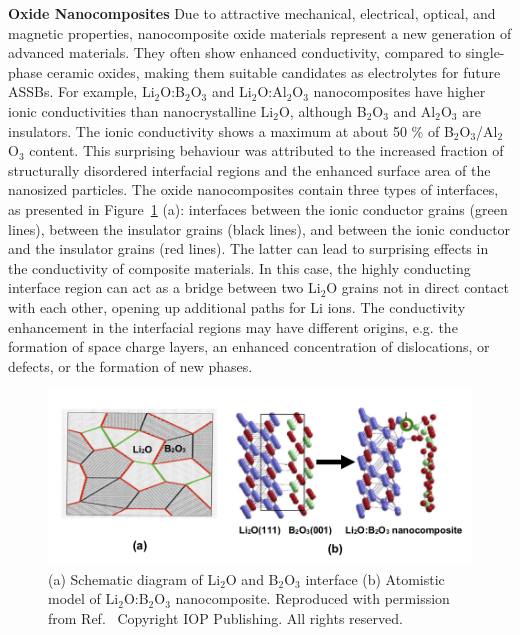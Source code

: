 \documentclass[../main.tex]{subfiles}
\begin{document}
\textbf{Oxide Nanocomposites} Due to attractive mechanical, electrical, optical, and magnetic properties, nanocomposite oxide materials represent a new generation of advanced materials.\cite{uvarov2011,Heitjans_2003} They often show enhanced conductivity, compared to single-phase ceramic oxides, making them suitable candidates as electrolytes for future ASSBs. For example, Li$_2$O:B$_2$O$_3$\cite{Heitjans_2003,Indris2000,Indris2002} and Li$_2$O:Al$_2$O$_3$ nanocomposites\cite{B300908D} have higher ionic conductivities than nanocrystalline Li$_2$O, although B$_2$O$_3$ and Al$_2$O$_3$ are insulators. The ionic conductivity shows a maximum at about 50 \% of B$_2$O$_3$/Al$_2$O$_3$ content. This surprising behaviour was attributed to the increased fraction of structurally disordered interfacial regions and the enhanced surface area of the nanosized particles.\cite{Heitjans_2003} The oxide nanocomposites contain three types of interfaces, as presented in Figure~\ref{fig:LBO} (a): interfaces between the ionic conductor grains (green lines), between the insulator grains (black lines), and between the ionic conductor and the insulator grains (red lines). The latter can lead to surprising effects in the conductivity of composite materials. In this case, the highly conducting interface region can act as a bridge between two Li$_2$O grains not in direct contact with each other, opening up additional paths for Li ions. The conductivity enhancement in the interfacial regions may have different origins, e.g. the formation of space charge layers, an enhanced concentration of dislocations, or defects, or the formation of new phases.

\begin{figure}
    \centering
    \includegraphics[scale=1]{figures/Islam-Fig-Li2O-B2O3.png}
    \caption{(a) Schematic diagram of Li$_2$O and B$_2$O$_3$ interface (b) Atomistic model of Li$_2$O:B$_2$O$_3$ nanocomposite. Reproduced with permission from Ref.~ Copyright IOP Publishing. All rights reserved.}
    \label{fig:LBO}
\end{figure}
\end{document}
